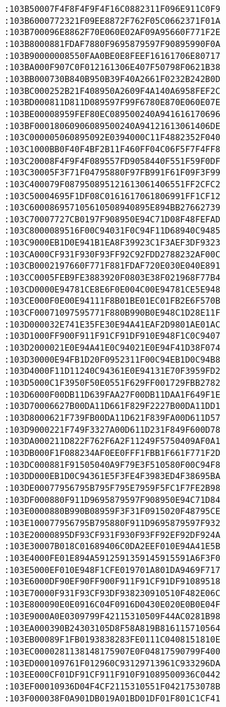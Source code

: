 \begin{lstlisting}[language={}, basicstyle=\scriptsize, caption=Машинний код]
:103B50007F4F8F4F9F4F16C0882311F096E911C0F9
:103B6000772321F09EE8872F762F05C0662371F01A
:103B700096E8862F70E060E02AF09A95660F771F2E
:103B8000881FDAF7880F9695879597F90895990F0A
:103B90000008550FAA0BE0E8FEEF16161706E80717
:103BA000F907C0F012161306E407F50798F0621B38
:103BB000730B840B950B39F40A2661F0232B242B0D
:103BC000252B21F408950A2609F4A140A6958FEF2C
:103BD000811D811D089597F99F6780E870E060E07E
:103BE00008959FEF80EC089500240A941616170696
:103BF00018060906089500240A94121613061406DE
:103C000005060895092E0394000C11F4882352F040
:103C1000BB0F40F4BF2B11F460FF04C06F5F7F4FF8
:103C20008F4F9F4F089557FD9058440F551F59F0DF
:103C30005F3F71F04795880F97FB991F61F09F3F99
:103C400079F087950895121613061406551FF2CFC2
:103C50004695F1DF08C0161617061806991FF1CF12
:103C600086957105610508940895E894BB27662739
:103C70007727CB0197F908950E94C71D08F48FEFAD
:103C8000089516F00C94031F0C94F11D68940C9485
:103C9000EB1D0E941B1EA8F39923C1F3AEF3DF9323
:103CA000CF931F930F93FF92C92FDD2788232AF00C
:103CB0002197660F771F881FDAF720E030E040E891
:103CC0005FEB9FE3883920F0803E38F021968F77B4
:103CD0000E94781CE8E6F0E004C00E94781CE5E948
:103CE000F0E00E94111F8B01BE01EC01FB2E6F570B
:103CF00071097595771F880B990B0E948C1D28E11F
:103D000032E741E35FE30E94A41EAF2D9801AE01AC
:103D1000FF900F911F91CF91DF910E948F1C0C9407
:103D2000021E0E94A41E0C94021E0E94F41D38F074
:103D30000E94FB1D20F0952311F00C94EB1D0C94B8
:103D4000F11D11240C94361E0E94131E70F3959FD2
:103D5000C1F3950F50E0551F629FF001729FBB2782
:103D6000F00DB11D639FAA27F00DB11DAA1F649F1E
:103D70006627B00DA11D661F829F2227B00DA11DD1
:103D8000621F739FB00DA11D621F839FA00D611D57
:103D9000221F749F3327A00D611D231F849F600D78
:103DA000211D822F762F6A2F11249F5750409AF0A1
:103DB000F1F088234AF0EE0FFF1FBB1F661F771F2D
:103DC000881F91505040A9F79E3F510580F00C94F8
:103DD000EB1D0C94361E5F3FE4F3983ED4F38695BA
:103DE00077956795B795F795E7959F5FC1F7FE2B98
:103DF000880F911D9695879597F908950E94C71D84
:103E0000880B990B08959F3F31F0915020F48795CE
:103E100077956795B795880F911D9695879597F932
:103E20000895DF93CF931F930F93FF92EF92DF924A
:103E30007B018C01689406C0DA2EEF010E94A41E5B
:103E4000FE01E894A5912591359145915591A6F3F0
:103E5000EF010E948F1CFE019701A801DA9469F717
:103E6000DF90EF90FF900F911F91CF91DF91089518
:103E70000F931F93CF93DF938230910510F482E06C
:103E800090E0E0916C04F0916D0430E020E0B0E04F
:103E9000A0E0309799F42115310509F44AC0281B98
:103EA000390B24303105D8F58A819B816115710564
:103EB00089F1FB0193838283FE0111C0408151810E
:103EC0000281138148175907E0F04817590799F400
:103ED000109761F012960C93129713961C933296DA
:103EE000CF01DF91CF911F910F91089500936C0442
:103EF00010936D04F4CF2115310551F0421753078B
:103F000038F0A901DB019A01BD01DF01F801C1CF41

\end{lstlisting}
